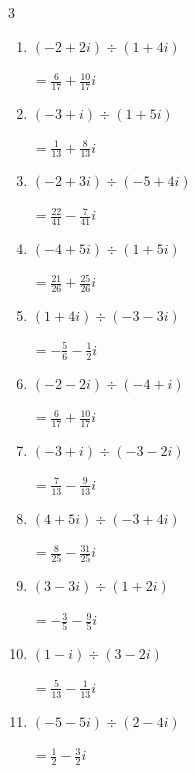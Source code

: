 \begin{multicols}{3}
\begin{enumerate}
        $\displaystyle =-\frac{1}{2}-2i$

  \item $\displaystyle (-2+2i)\div(1+4i)$

        $\displaystyle =\frac{6}{17}+\frac{10}{17}i$

\columnbreak %

\resetques

  \item $\displaystyle (-3+i)\div(1+5i)$

        $\displaystyle =\frac{1}{13}+\frac{8}{13}i$

  \item $\displaystyle (-2+3i)\div(-5+4i)$

        $\displaystyle =\frac{22}{41}-\frac{7}{41}i$

  \item $\displaystyle (-4+5i)\div(1+5i)$

        $\displaystyle =\frac{21}{26}+\frac{25}{26}i$

  \item $\displaystyle (1+4i)\div(-3-3i)$

        $\displaystyle =-\frac{5}{6}-\frac{1}{2}i$

  \item $\displaystyle (-2-2i)\div(-4+i)$

        $\displaystyle =\frac{6}{17}+\frac{10}{17}i$

  \item $\displaystyle (-3+i)\div(-3-2i)$

        $\displaystyle =\frac{7}{13}-\frac{9}{13}i$

  \item $\displaystyle (4+5i)\div(-3+4i)$

        $\displaystyle =\frac{8}{25}-\frac{31}{25}i$

  \item $\displaystyle (3-3i)\div(1+2i)$

        $\displaystyle =-\frac{3}{5}-\frac{9}{5}i$

  \item $\displaystyle (1-i)\div(3-2i)$

        $\displaystyle =\frac{5}{13}-\frac{1}{13}i$

  \item $\displaystyle (-5-5i)\div(2-4i)$

        $\displaystyle =\frac{1}{2}-\frac{3}{2}i$

\columnbreak %


\end{enumerate}
\end{multicols}
